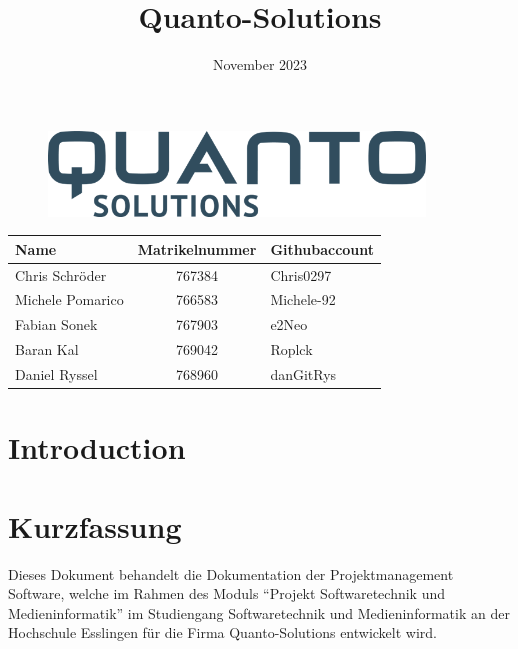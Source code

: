 \documentclass{article}
\begin{document}
\begin{figure}[h]
        \centering
        \includegraphics[width=10cm]{images/Logo.png}
\end{figure}



\title{Quanto-Solutions}

\date{November 2023}



\renewcommand{\listfigurename}{Abbildungsverzeichnis}



\maketitle


\begin{table}[h]
    \centering
   
    \begin{tabular}{|p{3cm}|c|p{3cm}|}
        \hline
        \textbf{Name} & \textbf{Matrikelnummer} & \textbf{Githubaccount} \\
        \hline
        Chris Schröder    & 767384    & Chris0297  \\
        Michele Pomarico  & 766583    & Michele-92 \\
        Fabian Sonek      & 767903    & e2Neo      \\
        Baran Kal         & 769042    & Roplck     \\
        Daniel Ryssel     & 768960    & danGitRys  \\
        \hline
    \end{tabular}
\end{table}


\newpage

\tableofcontents  %
 
\newpage
\listoffigures  %
\newpage


\section{Introduction}

\section{Kurzfassung}
    Dieses Dokument behandelt die Dokumentation der Projektmanagement Software, welche im Rahmen des Moduls “Projekt Softwaretechnik und Medieninformatik” im Studiengang Softwaretechnik und Medieninformatik an der Hochschule Esslingen für die Firma Quanto-Solutions entwickelt wird.
\end{document}
